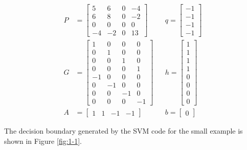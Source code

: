 \documentclass[10pt]{article}
\begin{document}
\begin{subequations}
\begin{align*}
	P &= \begin{bmatrix}
		5 & 6 & 0 & -4 \\
		6 & 8 & 0 & -2 \\
		0 & 0 & 0 & 0 \\
		-4 & -2 & 0 & 13
	\end{bmatrix} 
	&& q = \begin{bmatrix}
		-1 \\ -1 \\ -1 \\ -1
	\end{bmatrix} \\
	G &= \begin{bmatrix}
		1 & 0 & 0 & 0 \\
		0 & 1 & 0 & 0 \\
		0 & 0 & 1 & 0 \\
		0 & 0 & 0 & 1 \\
		-1 & 0 & 0 & 0 \\
		0 & -1 & 0 & 0 \\
		0 & 0 & -1 & 0 \\
		0 & 0 & 0 & -1
	\end{bmatrix} 
	&& h = \begin{bmatrix}
		1 \\ 1 \\ 1\\ 1\\ 0\\ 0\\ 0\\ 0
	\end{bmatrix}\\
	A &= \begin{bmatrix}
		1 & 1 & -1 & -1	
	\end{bmatrix} 
	&& b = \begin{bmatrix}
		0
	\end{bmatrix}
\end{align*}
\label{eq:1-1}
\end{subequations}

The decision boundary generated by the SVM code for the small example is shown in Figure \ref{fig:1-1}.
\end{document}
